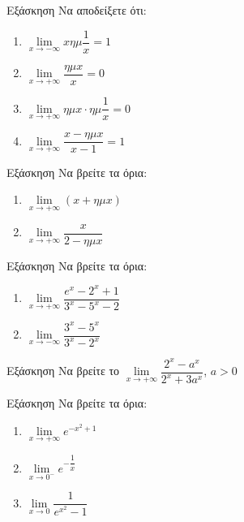 \documentclass{presentation}
\begin{document}
\begin{frame}{Εξάσκηση}
      Να αποδείξετε ότι:
      \begin{enumerate}
            \item $\lim\limits_{x \to -\infty}{ xημ\dfrac{1}{x} }=1$ \pause
            \item $\lim\limits_{x \to +\infty}{ \dfrac{ημx}{x}  }=0$  \pause
            \item $\lim\limits_{x \to +\infty}{ ημx\cdot ημ\dfrac{1}{x}  }=0$  \pause
            \item $\lim\limits_{x \to +\infty}{ \dfrac{x-ημx}{x-1}  }=1$
      \end{enumerate}
\end{frame}

\begin{frame}{Εξάσκηση}
      Να βρείτε τα όρια:
      \begin{enumerate}
            \item $\lim\limits_{x \to +\infty}{ (x+ημx) }$ \pause
            \item $\lim\limits_{x \to +\infty}{ \dfrac{x}{2-ημx}  }$
      \end{enumerate}
\end{frame}

\begin{frame}{Εξάσκηση}
      Να βρείτε τα όρια:
      \begin{enumerate}
            \item $\lim\limits_{x \to +\infty}{ \dfrac{e^x-2^x+1}{3^x-5^x-2} }$ \pause
            \item $\lim\limits_{x \to -\infty}{ \dfrac{3^x-5^x}{3^x-2^x}  }$
      \end{enumerate}
\end{frame}

\begin{frame}{Εξάσκηση}
      Να βρείτε το $\lim\limits_{x \to +\infty}{ \dfrac{2^x-a^x}{2^x+3a^x}  }$, $a>0$
\end{frame}

\begin{frame}{Εξάσκηση}
      Να βρείτε τα όρια:
      \begin{enumerate}
            \item $\lim\limits_{x \to +\infty}{ e^{-x^2+1} }$ \pause
            \item $\lim\limits_{x \to 0^-}{ e^{-\dfrac{1}{x}} }$\pause
            \item $\lim\limits_{x \to 0}{ \dfrac{1}{e^{x^2}-1}}$
      \end{enumerate}
\end{frame}
\end{document}
